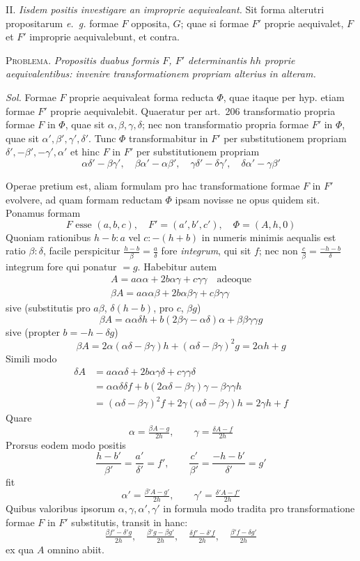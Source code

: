 II. \textit{Iisdem positis investigare an improprie aequivaleant.} Sit forma alterutri propositarum \textit{e.~g.} formae $F$ opposita, $G$; quae si formae $F'$ proprie aequivalet, $F$ et $F'$ improprie aequivalebunt, et contra.

\textsc{Problema.} \textit{Propositis duabus formis $F$, $F'$ determinantis $hh$ proprie aequivalentibus: invenire transformationem propriam alterius in alteram.}

\textit{Sol.} Formae $F$ proprie aequivaleat forma reducta $\Phi$, quae itaque per hyp. etiam formae $F'$ proprie aequivalebit. Quaeratur per art.~206 transformatio propria formae $F$ in $\Phi$, quae sit $\alpha,\beta,\gamma,\delta$; nec non transformatio propria formae $F'$ in $\Phi$, quae sit $\alpha',\beta',\gamma',\delta'$. Tunc $\Phi$ transformabitur in $F'$ per substitutionem propriam $\delta',-\beta',-\gamma',\alpha'$ et hinc $F$ in $F'$ per substitutionem propriam
\[
\alpha\delta'-\beta\gamma',\quad\beta\alpha'-\alpha\beta',\quad
\gamma\delta'-\delta\gamma',\quad\delta\alpha'-\gamma\beta'
\]

Operae pretium est, aliam formulam pro hac transformatione formae $F$ in $F'$ evolvere, ad quam formam reductam $\Phi$ ipsam novisse ne opus quidem sit. Ponamus formam
\[
F\text{ esse }(a,b,c),\quad F'=(a',b',c'),\quad\Phi=(A,h,0)
\]
Quoniam rationibus $h-b:a$ vel $c:-(h+b)$ in numeris minimis aequalis est ratio $\beta:\delta$, facile perspicitur $\frac{h-b}{\beta}=\frac a\delta$ fore \textit{integrum}, qui sit $f$; nec non $\frac c\beta=\frac{-h-b}{\delta}$ integrum fore qui ponatur $=g$. Habebitur autem
\[
\begin{gathered}A=a\alpha\alpha+2b\alpha\gamma+c\gamma\gamma\quad\text{adeoque}\\
\beta A=a\alpha\alpha\beta+2b\alpha\beta\gamma+c\beta\gamma\gamma\end{gathered}
\]
sive (substitutis pro $a\beta$, $\delta(h-b)$, pro $c$, $\beta g$)
\[
\beta A=\alpha\alpha\delta h+b(2\beta\gamma-\alpha\delta)\alpha+\beta\beta\gamma\gamma g
\]
sive (propter $b=-h-\delta g$)
\[
\beta A=2\alpha(\alpha\delta-\beta\gamma)h+(\alpha\delta-\beta\gamma)^2g=2\alpha h+g
\]
Simili modo
\[
\begin{aligned}
\delta A&=a\alpha\alpha\delta+2b\alpha\gamma\delta+c\gamma\gamma\delta\\
&=\alpha\alpha\delta\delta f+b(2\alpha\delta-\beta\gamma)\gamma-\beta\gamma\gamma h\\
&=(\alpha\delta-\beta\gamma)^2f+2\gamma(\alpha\delta-\beta\gamma)h=2\gamma h+f
\end{aligned}
\]
Quare
\[
\alpha=\tfrac{\beta A-g}{2h},\qquad\gamma=\tfrac{\delta A-f}{2h}
\]
Prorsus eodem modo positis
\[
\frac{h-b'}{\beta'}=\frac{a'}{\delta'}=f',\qquad
\frac{c'}{\beta'}=\frac{-h-b'}{\delta'}=g'
\]
fit
\[
\alpha'=\tfrac{\beta' A-g'}{2h},\qquad\gamma'=\tfrac{\delta' A-f'}{2h}
\]
Quibus valoribus ipsorum $\alpha,\gamma,\alpha',\gamma'$ in formula modo tradita pro transformatione formae $F$ in $F'$ substitutis, transit in hanc:
\[
\tfrac{\beta f'-\delta'g}{2h},\quad
\tfrac{\beta'g-\beta g'}{2h},\quad
\tfrac{\delta f'-\delta'f}{2h},\quad
\tfrac{\beta'f-\delta g'}{2h}
\]
ex qua $A$ omnino abiit.

